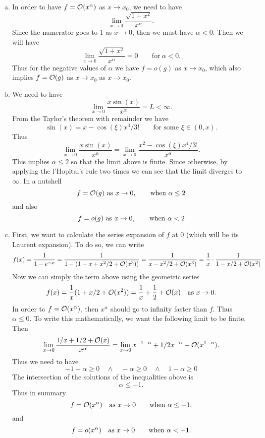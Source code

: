 \begin{solution}
	\begin{enumerate}[(a)]
		\item In order to have $ f = \mathcal{O}(x^\alpha) $ as $ x \to x_0 $, we need to have 
		\[ \lim_{x\to 0} \frac{\sqrt{1+x^2}}{x^\alpha}. \]
		Since the numerator goes to 1 as $ x \to 0 $, then we must have $ \alpha < 0 $. Then we will have 
		\[ \lim_{x\to 0} \frac{\sqrt{1+x^2}}{x^\alpha} = 0 \qquad \text{for}\ \alpha < 0. \]
		Thus for the negative values of $ \alpha $ we have $ f = o(g) $ as $ x\to x_0 $, which also implies $ f = \mathcal{O}(g) $ as $ x\to x_0 $ as $ x\to x_0 $.
		
		\item We need to have 
		\[ \lim_{x\to 0} \frac{x\sin(x)}{x^\alpha} = L < \infty. \]
		From the Taylor's theorem with remainder we have 
		\[ \sin(x) = x - \cos(\xi)x^3/3! \qquad\text{for some } \xi \in (0,x). \]
		Thus
		\[ \lim_{x\to 0} \frac{x\sin(x)}{x^\alpha} = \lim_{x\to 0} \frac{x^2 - \cos(\xi)x^4/3!}{x^\alpha}. \]
		This implies $ \alpha \leq 2 $ so that the limit above is finite. Since otherwise, by applying the l'Hopital's rule two times we can see that the limit diverges to $ \infty $. In a nutshell
		\[ f = \mathcal{O}(g) \ \text{as } x\to 0, \qquad \text{when } \alpha \leq 2 \]
		and also
		\[ f = o(g) \ \text{as } x\to 0, \qquad \text{when } \alpha < 2 \]
		
		\item First, we want to calculate the series expansion of $ f $ at $ 0 $ (which will be its Laurent expansion). To do so, we can write
		\[ f(x) = \frac{1}{1-e^{-x}} = \frac{1}{1-(1-x+x^2/2 + \mathcal{O}(x^3))} = \frac{1}{x - x^2/2 + \mathcal{O}(x^3)} = \frac{1}{x}\cdot \frac{1}{1-x/2+ \mathcal{O}(x^2)} \]
		Now we can simply the term above using the geometric series
		\[ f(x) = \frac{1}{x} (1+x/2 + \mathcal{O}(x^2)) = \frac{1}{x} + \frac{1}{2} + \mathcal{O}(x) \quad \text{as } x\to 0. \]
		In order to $ f = \mathcal{O}(x^\alpha) $, then $ x^\alpha $ should go to infinity faster than $ f $. Thus $ \alpha \leq 0 $. To write this mathematically, we want the following limit to be finite. Then
		\[ \lim_{x\to 0} \frac{1/x + 1/2 + \mathcal{O}(x)}{x^\alpha} = \lim_{x\to 0} x^{-1-\alpha} + 1/2 x^{-\alpha} + \mathcal{O}(x^{1-\alpha}).  \]
		Thus we need to have
		\[ -1-\alpha \geq 0 \quad \wedge \quad -\alpha\geq0 \quad \wedge \quad  1-\alpha \geq 0 \]
		The intersection of the solutions of the inequalities above is
		\[ \alpha \leq -1. \] 
		Thus in summary
		\[ f = \mathcal{O}(x^\alpha) \quad \text{as } x\to 0 \qquad \text{when } \alpha \leq -1, \]
		and
		\[ f = o(x^\alpha) \quad \text{as } x\to 0 \qquad \text{when } \alpha < -1. \]
		

\end{enumerate}
\end{solution}
